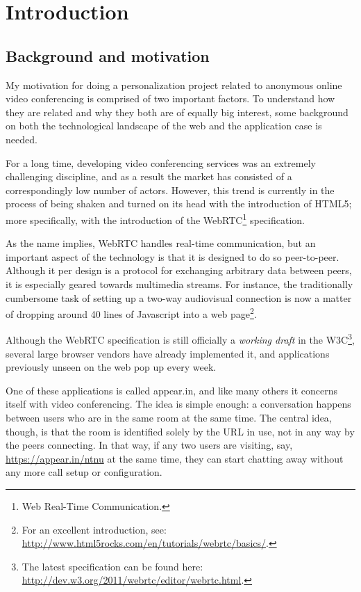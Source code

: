 \chapter{Introduction}

\label{Chapter1}



\section{Background and motivation}
\label{sec:motivation}

My motivation for doing a personalization project related to anonymous online video conferencing is comprised of two important factors. To understand how they are related and why they both are of equally big interest, some background on both the technological landscape of the web and the application case is needed.

For a long time, developing video conferencing services was an extremely challenging discipline, and as a result the market has consisted of a correspondingly low number of actors. However, this trend is currently in the process of being shaken and turned on its head with the introduction of HTML5; more specifically, with the introduction of the WebRTC\footnote{Web Real-Time Communication.} specification.

As the name implies, WebRTC handles real-time communication, but an important aspect of the technology is that it is designed to do so peer-to-peer. Although it per design is a protocol for exchanging arbitrary data between peers, it is especially geared towards multimedia streams. For instance, the traditionally cumbersome task of setting up a two-way audiovisual connection is now a matter of dropping around 40 lines of Javascript into a web page\footnote{For an excellent introduction, see: \url{http://www.html5rocks.com/en/tutorials/webrtc/basics/}.}.

Although the WebRTC specification is still officially a \emph{working draft} in the W3C\footnote{The latest specification can be found here: \url{http://dev.w3.org/2011/webrtc/editor/webrtc.html}.}, several large browser vendors have already implemented it, and applications previously unseen on the web pop up every week.

One of these applications is called appear.in, and like many others it concerns itself with video conferencing. The idea is simple enough: a conversation happens between users who are in the same room at the same time. The central idea, though, is that the room is identified solely by the URL in use, not in any way by the peers connecting. In that way, if any two users are visiting, say, \url{https://appear.in/ntnu} at the same time, they can start chatting away without any more call setup or configuration.

